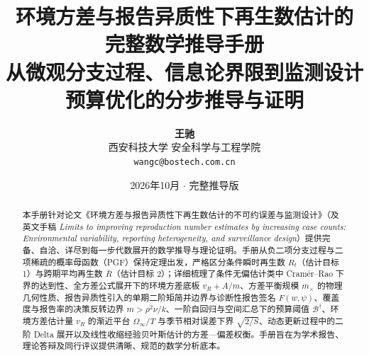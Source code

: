 \documentclass[11pt,a4paper]{ctexart}
\title{\Huge\bfseries\color{blue!80!black} 环境方差与报告异质性下再生数估计的\\完整数学推导手册\\[12pt]
\Large\normalfont\color{gray!80!black} 从微观分支过程、信息论界限到监测设计预算优化的分步推导与证明}
\author{\large\textbf{王驰}\\[4pt]
\normalsize 西安科技大学 安全科学与工程学院\\[2pt]
\small\texttt{wangc@bostech.com.cn}}
\date{\small 2026年10月 $\cdot$ 完整推导版}
\begin{document}
\maketitle
\thispagestyle{empty}

\begin{abstract}
\noindent 本手册针对论文《环境方差与报告异质性下再生数估计的不可约误差与监测设计》（及英文手稿 \emph{Limits to improving reproduction number estimates by increasing case counts: Environmental variability, reporting heterogeneity, and surveillance design}）提供完备、自洽、详尽到每一步代数展开的数学推导与理论证明。手册从负二项分支过程与二项稀疏的概率母函数（PGF）保持定理出发，严格区分条件瞬时再生数 $R_t$（估计目标 1）与跨期平均再生数 $\bar{R}$（估计目标 2）；详细梳理了条件无偏估计类中 Cramér--Rao 下界的达到性、全方差公式展开下的环境方差底板 $v_R + A/m$、方差平衡规模 $m_\times$ 的物理几何性质、报告异质性引入的单期二阶矩简并边界与诊断性报告签名 $F(w, \psi)$、覆盖度与报告率的决策反转边界 $m > \rho^2\nu/k$、一阶自回归与空间汇总下的预算阈值 $\mathcal{B}^\dagger$、环境方差估计量 $\hat{v}_R$ 的渐近平台 $\Omega_\infty/T$ 与季节相对误差下界 $\sqrt{2/S}$、动态更新过程中的二阶 Delta 展开以及线性收缩经验贝叶斯估计的方差—偏差权衡。手册旨在为学术报告、理论答辩及同行评议提供清晰、规范的数学分析底本。
\end{abstract}

\vspace{10pt}
\tableofcontents
\newpage

















\newpage

\small
\setlength{\bibsep}{2pt}

\end{document}
